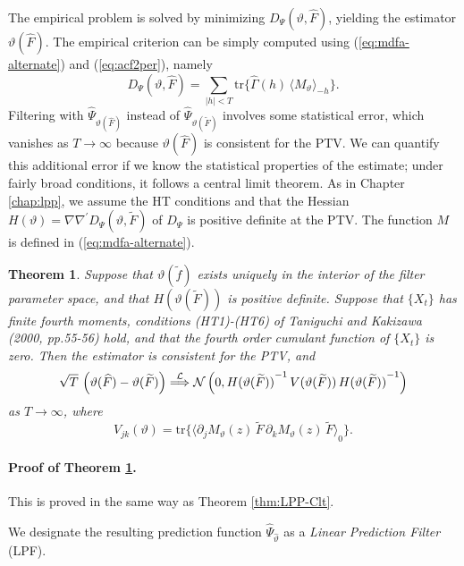 \documentclass[a4paper]{book}
\def\convinlaw{\stackrel{{\cal L}}{\Longrightarrow }}
\def\tends{\rightarrow}
\newtheorem{Theorem}{Theorem}
\begin{document}
  The empirical problem is solved by minimizing $D_{\Psi} (\vartheta, \widehat{F})$,
 yielding the estimator $\vartheta (\widehat{F})$.  The empirical criterion can be simply 
 computed using (\ref{eq:mdfa-alternate}) and (\ref{eq:acf2per}), namely
\[
   D_{\Psi} (\vartheta, \widehat{F}) = \sum_{|h| < T } \mbox{tr} \{ 
   \widehat{\Gamma} (h) \,  { \langle  M_{\vartheta} \rangle }_{-h} \}.
\] 
Filtering with  $\widehat{\Psi}_{\vartheta (\widehat{F})}$ instead
 of $\widehat{\Psi}_{\vartheta (\widetilde{F})}$
 involves some statistical error, which vanishes as $T \tends \infty$ because
  $\vartheta (  \widehat{F})$ is consistent for the PTV.  We can quantify this additional 
 error if we know the statistical properties of the estimate; under fairly broad conditions,
 it follows a central limit theorem.  As in Chapter \ref{chap:lpp}, we assume 
  the HT conditions and that   the  Hessian  $H(\vartheta) = \nabla \nabla^{\prime}
  D_{\Psi} (\vartheta, \widetilde{F}) $  of $D_{\Psi} $ is positive definite at the PTV.
  The function $M$ is defined in (\ref{eq:mdfa-alternate}).

\begin{Theorem} 
\label{thm:MDFAasymp}
 Suppose that $\vartheta (\widetilde{f})$ exists uniquely in the
 interior of the filter parameter space, and that
 $H(\vartheta (\widetilde{F}))$ is 
 positive definite.  Suppose that $\{ X_t \}$ has finite fourth moments, 
conditions (HT1)-(HT6) of Taniguchi and Kakizawa (2000, pp.55-56)
 hold, and that the fourth order cumulant function of $\{ X_t \}$ is zero.  
 Then the estimator is consistent for the PTV, and
\[
 \sqrt{T} \, \left( \vartheta( \widehat{F} ) - \vartheta (\widetilde{F}) \right) 
 \convinlaw \mathcal{N} \left( 0, { H(\vartheta (\widetilde{F})) }^{-1} \, 
 V (\vartheta (\widetilde{F})) \, { H(\vartheta (\widetilde{F})) }^{-1} \right)
\]
 as $T \tends \infty$, where 
\[
  V_{jk} (\vartheta) =  \mbox{tr} \{ { \langle  \partial_j M_{\vartheta} (z) \, \widetilde{F} \,
 \partial_k M_{\vartheta} (z) \, \widetilde{F} \rangle }_0 \}.
\]
\end{Theorem}

\paragraph{Proof of Theorem \ref{thm:MDFAasymp}.}
  This is proved in the same way as Theorem \ref{thm:LPP-Clt}.

\vspace{.5cm}

  We designate the resulting   prediction function
$\widehat{\Psi}_{\widehat{\vartheta}}$  as  a {\em Linear
Prediction Filter} (LPF). 
\end{document}
